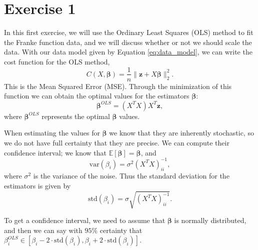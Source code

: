 \documentclass[10pt, a4paper]{article}
\begin{document}
\section*{Exercise 1}

    In this first exercise,  we will use the Ordinary Least Squares (OLS) method to fit the Franke function data, and we will discuss whether or not we should scale the data. With our data model given by Equation \eqref{eq:data_model}, we can write the cost function for the OLS method, 
    \begin{equation*}
        C(X, \bm{\beta}) = \frac{1}{n}\lVert \bm{z} + X\bm{\beta} \rVert_2^2.
    \end{equation*}
    This is the Mean Squared Error (MSE). Through the minimization of this function we can obtain the optimal values for the estimators $\bm{\beta}$:
    \begin{equation} \label{eq:ols_betas}
        \bm{\beta}^{OLS} = \left( X^T X \right) X^T \bm{z},
    \end{equation}
    where $\bm{\beta}^{OLS}$ represents the optimal $\bm{\beta}$ values.
    
    When estimating the values for $\bm{\beta}$ we know that they are inherently stochastic, so we do not have full certainty that they are precise. We can compute their confidence interval; we know that $\mathbb{E}[\bm{\beta}] = \bm{\beta}$, and
    \begin{equation*}
        \text{var}(\beta_i) = \sigma^2 \left( X^T X \right)_{ii}^{-1},
    \end{equation*}
    where $\sigma^2$ is the variance of the noise. Thus the standard deviation for the estimators is given by
    \begin{equation} \label{eq:std_betas}
        \text{std}(\beta_i) = \sigma \sqrt{\left( X^T X \right)_{ii}^{-1}}.
    \end{equation}
    
    To get a confidence interval, we need to assume that $\bm{\beta}$ is normally distributed, and then we can say with $95\%$ certainty that $\beta_i^{OLS} \in [\beta_i - 2 \cdot \text{std}(\beta_i), \beta_i + 2 \cdot \text{std}(\beta_i)]$.
    
\end{document}
